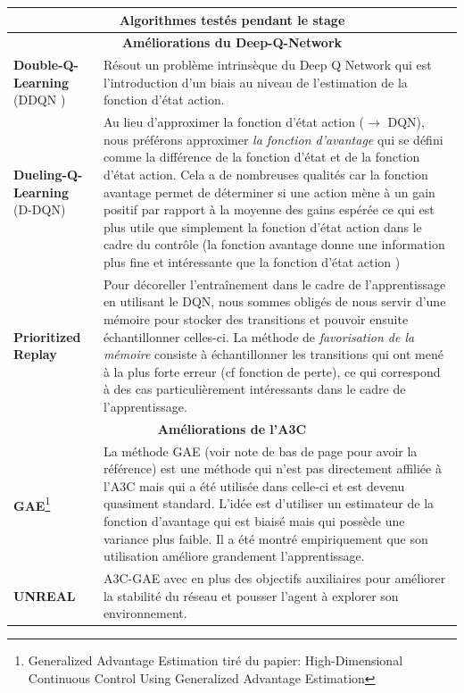 \begin{center}
{
\begin{tabular}{ |p{3.3cm}|p{11cm}|  }
\hline
\multicolumn{2}{|c|}{\textbf{Algorithmes testés pendant le stage}} \\
\hline
\multicolumn{2}{|c|}{\bf{Améliorations du Deep-Q-Network}} \\
\hline 
\textbf{Double-Q-Learning} (DDQN \cite{DDQN}) & Résout un problème intrinsèque du Deep Q Network qui est l'introduction d'un biais au niveau de l'estimation de la fonction d'état action.\\\hline


\textbf{Dueling-Q-Learning} \: (D-DQN\cite{DUEL}) & Au lieu d'approximer la fonction d'état action ($\rightarrow$ DQN), nous préférons approximer \emph{la fonction d'avantage} qui se défini comme la différence de la fonction d'état et de la fonction d'état action. Cela a de nombreuses qualités car la fonction avantage permet de déterminer si une action mène à un gain positif par rapport à la moyenne des gains espérée ce qui est plus utile que simplement la fonction d'état action dans le cadre du contrôle (la fonction avantage donne une information plus fine et intéressante que la fonction d'état action )  \\\hline

\textbf{Prioritized Replay}\cite{REPLAY} & Pour décoreller l'entraînement dans le cadre de l'apprentissage  en utilisant le DQN, nous sommes obligés de nous servir d'une mémoire pour stocker des transitions et pouvoir ensuite échantillonner celles-ci. La méthode de \emph{favorisation de la mémoire} consiste à échantillonner les transitions qui ont mené à la plus forte erreur (cf fonction de perte), ce qui correspond à des cas particulièrement intéressants dans le cadre de l'apprentissage.  \\\hline

\multicolumn{2}{|c|}{\bf{Améliorations de l'A3C}} \\
\hline 

\textbf{GAE}\footnote{Generalized Advantage Estimation tiré du papier: High-Dimensional Continuous Control Using Generalized Advantage Estimation }\cite{GAE} & La méthode GAE (voir note de bas de page pour avoir la référence) est une méthode qui n'est pas directement affiliée à l'A3C mais qui a été utilisée dans celle-ci et est devenu quasiment standard. L'idée est d'utiliser un estimateur de la fonction d'avantage qui est biaisé mais qui possède une variance plus faible. Il a été montré empiriquement que son utilisation améliore grandement l'apprentissage. \\\hline
\textbf{UNREAL}& A3C-GAE avec en plus des objectifs auxiliaires pour améliorer la stabilité du réseau et pousser l'agent à explorer son environnement.
\\\hline
\end{tabular}
}
\end{center}


